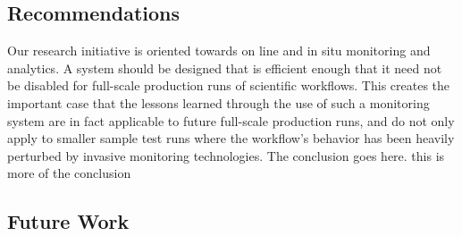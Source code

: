 \documentclass[10pt, conference, compsocconf]{IEEEtran}
\begin{document}
\subsection{Recommendations}
Our research initiative is oriented towards on line and in 
situ monitoring and  analytics. A system should be designed that is efficient 
enough that it need not 
be disabled for full-scale production runs of scientific workflows. This creates 
the important case that the lessons learned through the use of such a 
monitoring system are in fact applicable to future full-scale production runs, 
and do not only apply to smaller sample test runs where the workflow's behavior 
has been heavily perturbed by invasive monitoring technologies.
The conclusion goes here. this is more of the conclusion
\subsection{Future Work}

%
%



%
%
\end{document}
